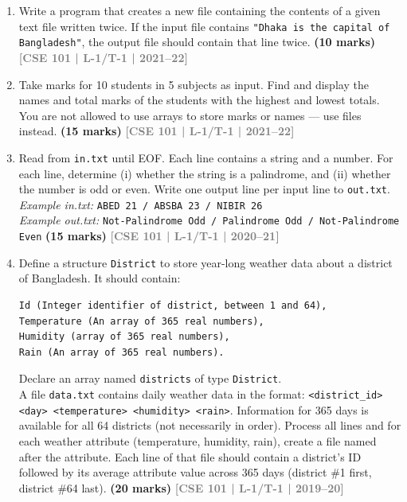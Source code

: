 \documentclass[12pt,a3paper]{article}
\newcommand{\yr}[1]{\hfill\textcolor{gray}{\small\textbf{[#1]}}}
\newcommand{\mk}[1]{\textcolor{orange!70!black}{\small\textbf{(#1 marks)}}}
\begin{document}
\begin{enumerate}
\begin{lstlisting}
FILE *fp = fopen("input.txt", "r");
int num = 0, sum = 0;
for (int i = 0; i < 10; i++) {
    fscanf(fp, "%d", &num);
    sum += num;
}
fprintf(fp, "%d", sum);
\end{lstlisting}
\mk{4} \yr{CSE 101 | L-1/T-1 | 2021--22}

\item Write a program that creates a new file containing the contents of a given text file written twice. If the input file contains \texttt{"Dhaka is the capital of Bangladesh"}, the output file should contain that line twice.
\mk{10} \yr{CSE 101 | L-1/T-1 | 2021--22}

\item Take marks for 10 students in 5 subjects as input. Find and display the names and total marks of the students with the highest and lowest totals. You are not allowed to use arrays to store marks or names --- use files instead.
\mk{15} \yr{CSE 101 | L-1/T-1 | 2021--22}

\item Read from \texttt{in.txt} until EOF. Each line contains a string and a number. For each line, determine (i) whether the string is a palindrome, and (ii) whether the number is odd or even. Write one output line per input line to \texttt{out.txt}.\\
\textit{Example in.txt:} \texttt{ABED 21 / ABSBA 23 / NIBIR 26}\\
\textit{Example out.txt:} \texttt{Not-Palindrome Odd / Palindrome Odd / Not-Palindrome Even}
\mk{15} \yr{CSE 101 | L-1/T-1 | 2020--21}

\item Define a structure \texttt{District} to store year-long weather data about a district of Bangladesh. It should contain:
\begin{lstlisting}
Id (Integer identifier of district, between 1 and 64),
Temperature (An array of 365 real numbers),
Humidity (array of 365 real numbers),
Rain (An array of 365 real numbers). 
\end{lstlisting}
Declare an array named \texttt{districts} of type \texttt{District}.\\

A file \texttt{data.txt} contains daily weather data in the format: \texttt{<district\_id> <day> <temperature> <humidity> <rain>}. Information for 365 days is available for all 64 districts (not necessarily in order). Process all lines and for each weather attribute (temperature, humidity, rain), create a file named after the attribute. Each line of that file should contain a district's ID followed by its average attribute value across 365 days (district \#1 first, district \#64 last).
\mk{20} \yr{CSE 101 | L-1/T-1 | 2019--20}


\end{enumerate}
\end{document}
